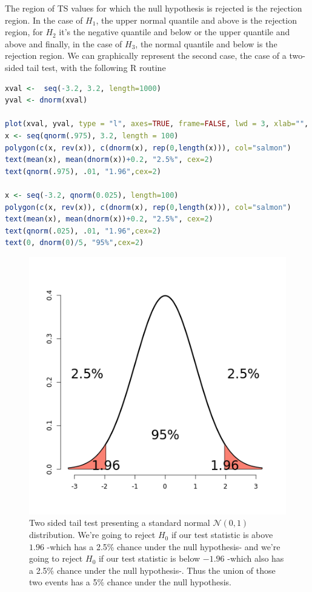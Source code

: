 \documentclass{homework}
\begin{document}
The region of TS values for which the null hypothesis is rejected is the rejection region. In the case of $H_1$, the upper normal quantile and above is the rejection region, for $H_2$ it's the negative quantile and below or the upper quantile and above and finally, in the case of $H_3$, the normal quantile and below is the rejection region. We can graphically represent the second case, the case of a two-sided tail test, with the following R routine

\begin{lstlisting}[language=R]
xval <-  seq(-3.2, 3.2, length=1000)
yval <- dnorm(xval)

plot(xval, yval, type = "l", axes=TRUE, frame=FALSE, lwd = 3, xlab="", ylab= "")
x <- seq(qnorm(.975), 3.2, length = 100)
polygon(c(x, rev(x)), c(dnorm(x), rep(0,length(x))), col="salmon")
text(mean(x), mean(dnorm(x))+0.2, "2.5%", cex=2)
text(qnorm(.975), .01, "1.96",cex=2)

x <- seq(-3.2, qnorm(0.025), length=100)
polygon(c(x, rev(x)), c(dnorm(x), rep(0,length(x))), col="salmon")
text(mean(x), mean(dnorm(x))+0.2, "2.5%", cex=2)
text(qnorm(.025), .01, "1.96",cex=2)
text(0, dnorm(0)/5, "95%",cex=2)
\end{lstlisting}

\begin{figure}
    \centering
    \includegraphics[scale = 0.4]{figs/two sided tail test.png}
    \caption{Two sided tail test presenting a standard normal $\mathcal{N}(0,1)$ distribution. We're going to reject $H_0$ if our test statistic is above $1.96$ -which has a 2.5\% chance under the null hypothesis- and we're going to reject $H_0$ if our test statistic is below $-1.96$ -which also has a 2.5\% chance under the null hypothesis-. Thus the union of those two events has a 5\% chance under the null hypothesis. }
    \label{fig:my_label}
\end{figure}
\end{document}
